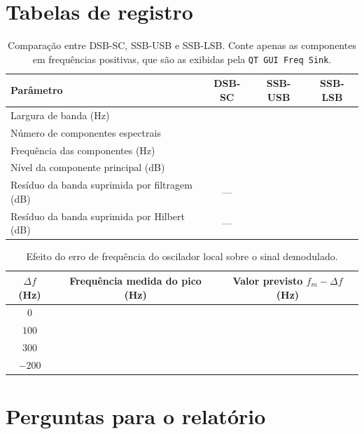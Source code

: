 \documentclass[11pt,a4paper]{article}
\begin{document}
\section{Tabelas de registro}

\begin{table}[H]
  \centering
  \begin{tabular}{l c c c}
    \toprule
    \textbf{Parâmetro} & \textbf{DSB-SC} & \textbf{SSB-USB} & \textbf{SSB-LSB} \\
    \midrule
    Largura de banda (Hz)                    & & & \\
    Número de componentes espectrais         & & & \\
    Frequência das componentes (Hz)          & & & \\
    Nível da componente principal (dB)       & & & \\
    Resíduo da banda suprimida por filtragem (dB) & --- & & \\
    Resíduo da banda suprimida por Hilbert (dB)   & --- & & \\
    \bottomrule
  \end{tabular}
  \caption{Comparação entre DSB-SC, SSB-USB e SSB-LSB. Conte apenas as
    componentes em frequências positivas, que são as exibidas pela
    \texttt{QT GUI Freq Sink}.}
  \label{tab:comp}
\end{table}

\begin{table}[H]
  \centering
  \begin{tabular}{c c c}
    \toprule
    $\Delta f$ (Hz) & Frequência medida do pico (Hz) & Valor previsto $f_m - \Delta f$ (Hz) \\
    \midrule
    $0$    & & \\
    $100$  & & \\
    $300$  & & \\
    $-200$ & & \\
    \bottomrule
  \end{tabular}
  \caption{Efeito do erro de frequência do oscilador local sobre o sinal
    demodulado.}
  \label{tab:df}
\end{table}

\section{Perguntas para o relatório}
\end{document}
